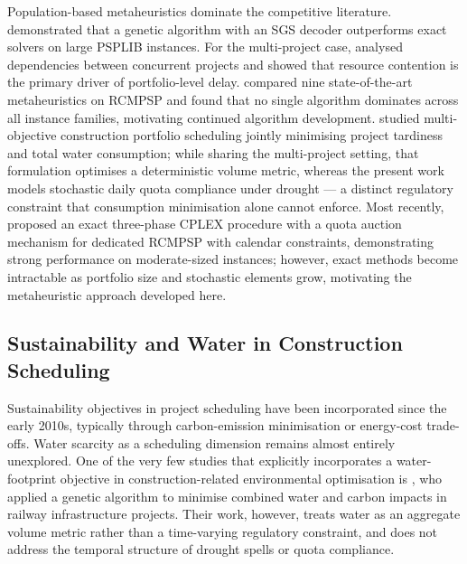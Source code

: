 \documentclass[12pt,a4paper]{article}
\begin{document}
Population-based metaheuristics dominate the competitive literature.
\citet{Goncalves2008} demonstrated that a genetic algorithm with an SGS decoder
outperforms exact solvers on large PSPLIB instances.  For the multi-project case,
\citet{Browning2010} analysed dependencies between concurrent projects and showed
that resource contention is the primary driver of portfolio-level delay.
\citet{Bredael2023} compared nine state-of-the-art metaheuristics on RCMPSP and
found that no single algorithm dominates across all instance families, motivating
continued algorithm development.  \citet{Lostumbo2025} studied multi-objective
construction portfolio scheduling jointly minimising project tardiness and total
water consumption; while sharing the multi-project setting, that formulation
optimises a deterministic volume metric, whereas the present work models
stochastic daily quota compliance under drought --- a distinct regulatory
constraint that consumption minimisation alone cannot enforce.
Most recently, \citet{Kong2025} proposed an exact three-phase CPLEX procedure with
a quota auction mechanism for dedicated RCMPSP with calendar constraints,
demonstrating strong performance on moderate-sized instances; however, exact methods
become intractable as portfolio size and stochastic elements grow, motivating the
metaheuristic approach developed here.

\subsection{Sustainability and Water in Construction Scheduling}
\label{sec:lit:water}

Sustainability objectives in project scheduling have been incorporated since the
early 2010s, typically through carbon-emission minimisation \citep{Xu2012} or
energy-cost trade-offs.  Water scarcity as a scheduling dimension remains almost entirely unexplored.
One of the very few studies that explicitly incorporates a water-footprint
objective in construction-related environmental optimisation is
\citet{Barrientos2016}, who applied a genetic algorithm to minimise combined
water and carbon impacts in railway infrastructure projects.  Their work,
however, treats water as an aggregate volume metric rather than a time-varying
regulatory constraint, and does not address the temporal structure of drought
spells or quota compliance.
\end{document}
